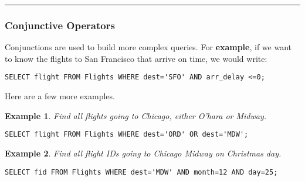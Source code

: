 \documentclass{article}
\newtheorem{example}{Example}
\begin{document}
\hspace{-0.5cm}\rule[0.101in]{\textwidth}{0.0025in}

















\subsubsection*{Conjunctive Operators}

Conjunctions are used to build more complex queries. For \textbf{example}, if we want to know the flights to San Francisco that arrive on time, we would write:



\begin{lstlisting}[frame=single]  
SELECT flight FROM Flights WHERE dest='SFO' AND arr_delay <=0;
\end{lstlisting} 



\noindent Here are a few more examples.

\begin{example}
Find all flights going to Chicago, either O'hara or Midway.  
\end{example}


\begin{lstlisting}[frame=single]  
SELECT flight FROM Flights WHERE dest='ORD' OR dest='MDW';
\end{lstlisting} 






\begin{example}
Find all flight IDs going to Chicago Midway on Christmas day.    
\end{example}


\begin{lstlisting}[frame=single]  
SELECT fid FROM Flights WHERE dest='MDW' AND month=12 AND day=25;
\end{lstlisting} 
\end{document}
